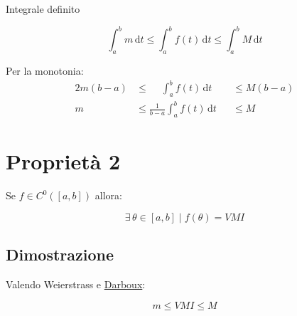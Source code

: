 \documentclass[../../dimostrazioni]{subfiles}
\begin{document}
            Integrale definito

            \[\int_{a}^{b} \! m \, \mathrm{d} t \leqslant \int_{a}^{b} \! f(t) \, \mathrm{d} t \leqslant \int_{a}^{b} \! M \, \mathrm{d} t\]

            Per la monotonia:
            \begin{alignat*}{2}
                m(b-a) &\leqslant \quad \: \int_{a}^{b} \! f(t) \, \mathrm{d} t &&\leqslant M(b-a) \\
                m &\leqslant \frac{1}{b-a} \int_{a}^{b} \! f(t) \, \mathrm{d} t &&\leqslant M
            \end{alignat*}

    \section*{Proprietà 2}

        Se \(f \in C^0 ([a,b]) \) allora:


        \[\exists \, \theta\in [a, b] \mid f(\theta) = VMI \]

        \subsection*{Dimostrazione}
    
            Valendo Weierstrass e \hyperref[teoDarboux]{Darboux}:

            \[m \leqslant VMI \leqslant M \]
\end{document}
